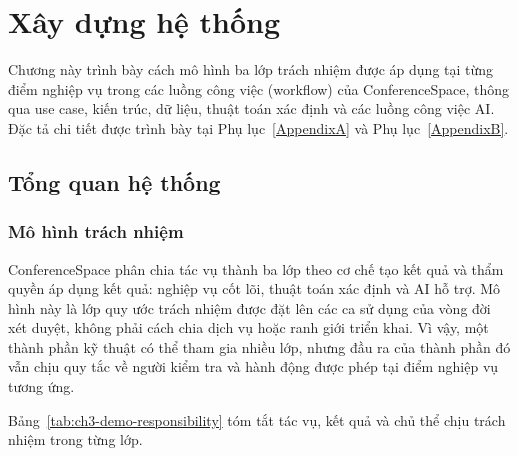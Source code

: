 
\chapter{Xây dựng hệ thống}
\label{Chapter3}

Chương này trình bày cách mô hình ba lớp trách nhiệm được áp dụng tại từng điểm nghiệp vụ trong các luồng công việc (workflow) của ConferenceSpace, thông qua use case, kiến trúc, dữ liệu, thuật toán xác định và các luồng công việc AI. Đặc tả chi tiết được trình bày tại Phụ lục~\ref{AppendixA} và Phụ lục~\ref{AppendixB}.

\section{Tổng quan hệ thống}
\label{sec:ch3-demo-overview}

\subsection{Mô hình trách nhiệm}

ConferenceSpace phân chia tác vụ thành ba lớp theo cơ chế tạo kết quả và thẩm quyền áp dụng kết quả: nghiệp vụ cốt lõi, thuật toán xác định và AI hỗ trợ. Mô hình này là lớp quy ước trách nhiệm được đặt lên các ca sử dụng của vòng đời xét duyệt, không phải cách chia dịch vụ hoặc ranh giới triển khai. Vì vậy, một thành phần kỹ thuật có thể tham gia nhiều lớp, nhưng đầu ra của thành phần đó vẫn chịu quy tắc về người kiểm tra và hành động được phép tại điểm nghiệp vụ tương ứng.

Bảng~\ref{tab:ch3-demo-responsibility} tóm tắt tác vụ, kết quả và chủ thể chịu trách nhiệm trong từng lớp.

